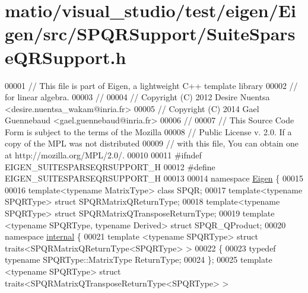 \hypertarget{matio_2visual__studio_2test_2eigen_2_eigen_2src_2_s_p_q_r_support_2_suite_sparse_q_r_support_8h_source}{}\section{matio/visual\+\_\+studio/test/eigen/\+Eigen/src/\+S\+P\+Q\+R\+Support/\+Suite\+Sparse\+Q\+R\+Support.h}
\label{matio_2visual__studio_2test_2eigen_2_eigen_2src_2_s_p_q_r_support_2_suite_sparse_q_r_support_8h_source}

\begin{DoxyCode}
00001 \textcolor{comment}{// This file is part of Eigen, a lightweight C++ template library}
00002 \textcolor{comment}{// for linear algebra.}
00003 \textcolor{comment}{//}
00004 \textcolor{comment}{// Copyright (C) 2012 Desire Nuentsa <desire.nuentsa\_wakam@inria.fr>}
00005 \textcolor{comment}{// Copyright (C) 2014 Gael Guennebaud <gael.guennebaud@inria.fr>}
00006 \textcolor{comment}{//}
00007 \textcolor{comment}{// This Source Code Form is subject to the terms of the Mozilla}
00008 \textcolor{comment}{// Public License v. 2.0. If a copy of the MPL was not distributed}
00009 \textcolor{comment}{// with this file, You can obtain one at http://mozilla.org/MPL/2.0/.}
00010 
00011 \textcolor{preprocessor}{#ifndef EIGEN\_SUITESPARSEQRSUPPORT\_H}
00012 \textcolor{preprocessor}{#define EIGEN\_SUITESPARSEQRSUPPORT\_H}
00013 
00014 \textcolor{keyword}{namespace }\hyperlink{namespace_eigen}{Eigen} \{
00015   
00016   \textcolor{keyword}{template}<\textcolor{keyword}{typename} MatrixType> \textcolor{keyword}{class }SPQR; 
00017   \textcolor{keyword}{template}<\textcolor{keyword}{typename} SPQRType> \textcolor{keyword}{struct }SPQRMatrixQReturnType; 
00018   \textcolor{keyword}{template}<\textcolor{keyword}{typename} SPQRType> \textcolor{keyword}{struct }SPQRMatrixQTransposeReturnType; 
00019   \textcolor{keyword}{template} <\textcolor{keyword}{typename} SPQRType, \textcolor{keyword}{typename} Derived> \textcolor{keyword}{struct }SPQR\_QProduct;
00020   \textcolor{keyword}{namespace }\hyperlink{namespaceinternal}{internal} \{
00021     \textcolor{keyword}{template} <\textcolor{keyword}{typename} SPQRType> \textcolor{keyword}{struct }traits<SPQRMatrixQReturnType<SPQRType> >
00022     \{
00023       \textcolor{keyword}{typedef} \textcolor{keyword}{typename} SPQRType::MatrixType ReturnType;
00024     \};
00025     \textcolor{keyword}{template} <\textcolor{keyword}{typename} SPQRType> \textcolor{keyword}{struct }traits<SPQRMatrixQTransposeReturnType<SPQRType> >

\end{DoxyCode}
